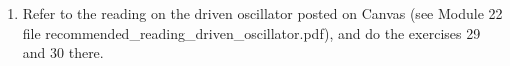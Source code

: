 \documentclass[fleqn]{article}
\begin{document}
\begin{enumerate}
\begin{enumerate}
          \bigbreak

          \textcolor{hwColor}{
            $
              y_c(t)=Ae^{(-\gamma+i\omega_0)t}+Be^{(-\gamma-i\omega_0)t}=e^{-\gamma t}\left[Ae^{i \omega_0 t}+Be^{-i \omega_0 t}\right] \\
              \\
              =e^{-\gamma t}\left[Acos(\omega_0 t)+iAsin(\omega_0 t)+Bcos(\omega_0 t)-iBsin(\omega_0 t)\right] \\
              \\
              =e^{-\gamma t}\left[(A+B)cos(\omega_0 t)+i(A-B)sin(\omega_0 t)\right] \\
              \\
              =L_0 e^{-\gamma t}cos(omega_0 t+\phi) \\
              \\
              \Longrightarrow \begin{cases}
                \omega_0=\sqrt{\dfrac{c}{a}-(\dfrac{b}{2a})^2} \\
                \\
                \gamma=\dfrac{b}{2a}
              \end{cases}
            $
          }

        \item Exercise 27
        
        \item Exercise 28
      
      \end{enumerate}

    \item Refer to the reading on the driven oscillator posted on Canvas (see Module 22 file recommended\_reading\_driven\_oscillator.pdf), and do the exercises 29 and 30 there. 
          
  \end{enumerate}
\end{document}
